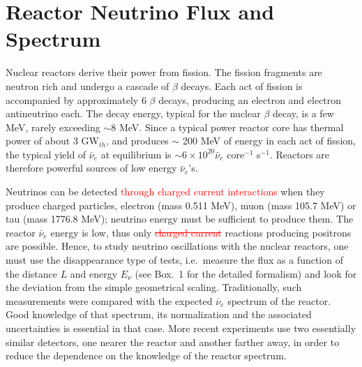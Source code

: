 \documentclass[aps,twocolumn,preprintnumbers,amsmath,superscriptaddress,amssymb,floats,nofootinbib]{revtex4-1}
\begin{document}
\section{Reactor Neutrino Flux and Spectrum} 
\label{sec:flux}

Nuclear reactors derive their power from fission. The fission fragments are neutron rich and undergo a cascade of $\beta$ decays. Each act of fission
is accompanied by approximately 6 $\beta$ decays, producing an electron and electron antineutrino each. The decay energy, typical for the nuclear
$\beta$ decay, is a few MeV, rarely exceeding $\sim$8 MeV. Since a typical power reactor core has thermal power of about 3 GW$_{th}$, and produces
$\sim$ 200 MeV of energy in each act of fission, the typical yield of $\bar{\nu}_e$ at equilibrium is $\sim 6 \times 10^{20} \bar{\nu}_e$ core$^{-1}$ s$^{-1}$.   
Reactors are therefore powerful sources of low energy $\bar{\nu}_e$'s.

Neutrinos can be detected \textcolor{red}{through charged current interactions} when they produce charged particles, electron (mass 0.511 MeV),
muon (mass 105.7 MeV) or tau (mass 1776.8 MeV); neutrino energy must be sufficient to
produce them. The reactor $\bar{\nu}_e$ energy is low, thus only \textcolor{red}{\st{charged current}} reactions producing positrons are possible. Hence, to study neutrino oscillations with
the nuclear reactors, one must use the disappearance type of tests, i.e.~measure the flux as a function of the distance $L$ and energy $E_{\nu}$ (see Box.~1 for the detailed formalism) and
look for the deviation from the simple geometrical scaling. Traditionally, such measurements were compared with the expected  $\bar{\nu}_e$ spectrum
of the reactor. Good knowledge of that spectrum, its normalization and the associated uncertainties is essential in that case.  More recent experiments
\cite{Dayabay,Reno} use two essentially similar detectors, one nearer the reactor and another farther away, in order to reduce the dependence on the
knowledge of the reactor spectrum.
\end{document}
